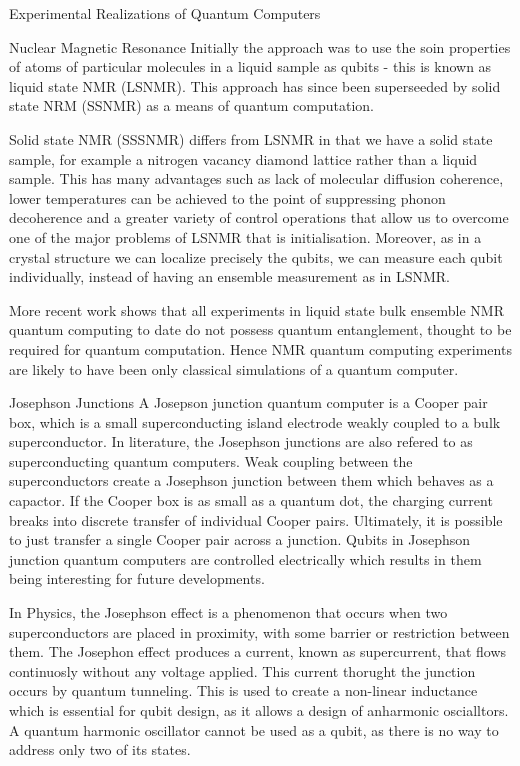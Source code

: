 \documentclass[aps,preprintnumbers,twocolumn]{revtex4}
\begin{document}
\begin{section}{Experimental Realizations of Quantum Computers}
\begin{subsection}{Nuclear Magnetic Resonance}
Initially the approach was to use the soin properties of atoms of particular molecules in a liquid sample as qubits - 
this is known as liquid state NMR (LSNMR). 
This approach has since been superseeded by solid state NRM (SSNMR) as a means of quantum computation.

Solid state NMR (SSSNMR) differs from LSNMR in that we have a solid state sample, 
for example a nitrogen vacancy diamond lattice rather than a liquid sample. 
This has many advantages such as lack of molecular diffusion coherence, 
lower temperatures can be achieved to the point of suppressing phonon decoherence and a greater variety of control operations that allow us to overcome one of the major problems of LSNMR that is initialisation. 
Moreover, as in a crystal structure we can localize precisely the qubits, 
we can measure each qubit individually, 
instead of having an ensemble measurement as in LSNMR. 

More recent work shows that all experiments in liquid state bulk ensemble NMR quantum computing to date do not possess quantum entanglement, 
thought to be required for quantum computation. 
Hence NMR quantum computing experiments are likely to have been only classical simulations of a quantum computer. 
\end{subsection}

\begin{subsection}{Josephson Junctions}
A Josepson junction quantum computer is a Cooper pair box,
which is a small superconducting island electrode weakly coupled to a bulk superconductor. 
In literature, the Josephson junctions are also refered to as superconducting quantum computers.
Weak coupling between the superconductors create a Josephson junction between them which behaves as a capactor. 
If the Cooper box is as small as a quantum dot, 
the charging current breaks into discrete transfer of individual Cooper pairs. 
Ultimately, it is possible to just transfer a single Cooper pair across a junction. 
Qubits in Josephson junction quantum computers are controlled electrically which results in them being interesting for future developments.

In Physics, the Josephson effect is a phenomenon that occurs when two superconductors are placed in proximity, 
with some barrier or restriction between them. 
The Josephon effect produces a current, known as supercurrent, that flows continuosly without any voltage applied. 
This current thorught the junction occurs by quantum tunneling. 
This is used to create a non-linear inductance which is essential for qubit design, 
as it allows a design of anharmonic oscialltors. 
A quantum harmonic oscillator cannot be used as a qubit, 
as there is no way to address only two of its states. 
\end{subsection}


\end{section}
\end{document}

